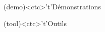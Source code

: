 \documentclass[../../main/main.tex]{subfiles}
\begin{document}
\begin{tcn}[%
		sidebyside, fontupper=\small, fontlower=\small
	]
	\begin{tcn}[nsp](demo)<ctc>'t'{Démonstrations}
		\vspace{-25pt}
	\end{tcn}
	\begin{tcn}[nsp](tool)<ctc>'t'{Outils}
		\vspace{-25pt}

\end{tcn}
\end{tcn}
\end{document}

